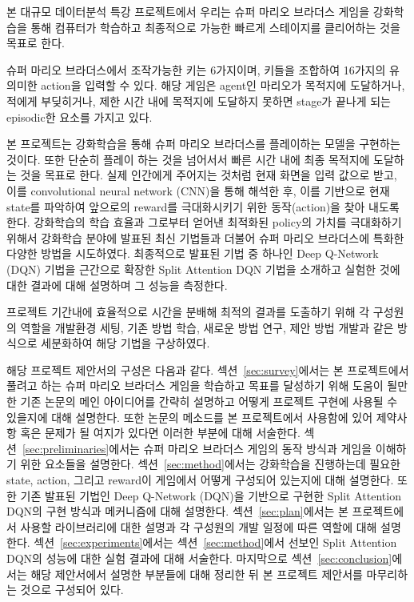 본 대규모 데이터분석 특강 프로젝트에서 우리는 슈퍼 마리오 브라더스 게임을 강화학습을 통해 컴퓨터가 학습하고 최종적으로 가능한 빠르게 스테이지를 클리어하는 것을 목표로 한다.

슈퍼 마리오 브라더스에서 조작가능한 키는 6가지이며, 키들을 조합하여 16가지의 유의미한 action을 입력할 수 있다.
해당 게임은 agent인 마리오가 목적지에 도달하거나, 적에게 부딪히거나, 제한 시간 내에 목적지에 도달하지 못하면 stage가 끝나게 되는 episodic한 요소를 가지고 있다. 

본 프로젝트는 강화학습을 통해 슈퍼 마리오 브라더스를 플레이하는 모델을 구현하는 것이다.
또한 단순히 플레이 하는 것을 넘어서서 빠른 시간 내에 최종 목적지에 도달하는 것을 목표로 한다. 
실제 인간에게 주어지는 것처럼 현재 화면을 입력 값으로 받고, 이를 convolutional neural network (CNN)을 통해 해석한 후, 이를 기반으로 현재 state를 파악하여 앞으로의 reward를 극대화시키기 위한 동작(action)을 찾아 내도록 한다.
강화학습의 학습 효율과 그로부터 얻어낸 최적화된 policy의 가치를 극대화하기 위해서 강화학습 분야에 발표된 최신 기법들과 더불어 슈퍼 마리오 브라더스에 특화한 다양한 방법을 시도하였다.
최종적으로 발표된 기법 중 하나인 Deep Q-Network (DQN) 기법을 근간으로 확장한 Split Attention DQN 기법을 소개하고 실험한 것에 대한 결과에 대해 설명하며 그 성능을 측정한다. 

프로젝트 기간내에 효율적으로 시간을 분배해 최적의 결과를 도출하기 위해 각 구성원의 역할을 개발환경 세팅, 기존 방법 학습, 새로운 방법 연구, 제안 방법 개발과 같은 방식으로 세분화하여 해당 기법을 구상하였다.

해당 프로젝트 제안서의 구성은 다음과 같다. 
섹션~\ref{sec:survey}에서는 본 프로젝트에서 풀려고 하는 슈퍼 마리오 브라더스 게임을 학습하고 목표를 달성하기 위해 도움이 될만한 기존 논문의 메인 아이디어를 간략히 설명하고 어떻게 프로젝트 구현에 사용될 수 있을지에 대해 설명한다. 
또한 논문의 메소드를 본 프로젝트에서 사용함에 있어 제약사항 혹은 문제가 될 여지가 있다면 이러한 부분에 대해 서술한다. 
섹션~\ref{sec:preliminaries}에서는 슈퍼 마리오 브라더스 게임의 동작 방식과 게임을 이해하기 위한 요소들을 설명한다.
섹션~\ref{sec:method}에서는 강화학습을 진행하는데 필요한 state, action, 그리고 reward이 게임에서 어떻게 구성되어 있는지에 대해 설명한다. 
또한 기존 발표된 기법인 Deep Q-Network (DQN)을 기반으로 구현한 Split Attention DQN의 구현 방식과 메커니즘에 대해 설명한다.
섹션~\ref{sec:plan}에서는 본 프로젝트에서 사용할 라이브러리에 대한 설명과 각 구성원의 개발 일정에 따른 역할에 대해 설명한다. 
섹션~\ref{sec:experiments}에서는 섹션~\ref{sec:method}에서 선보인 Split Attention DQN의 성능에 대한 실험 결과에 대해 서술한다.
마지막으로 섹션~\ref{sec:conclusion}에서는 해당 제안서에서 설명한 부분들에 대해 정리한 뒤 본 프로젝트 제안서를 마무리하는 것으로 구성되어 있다.
